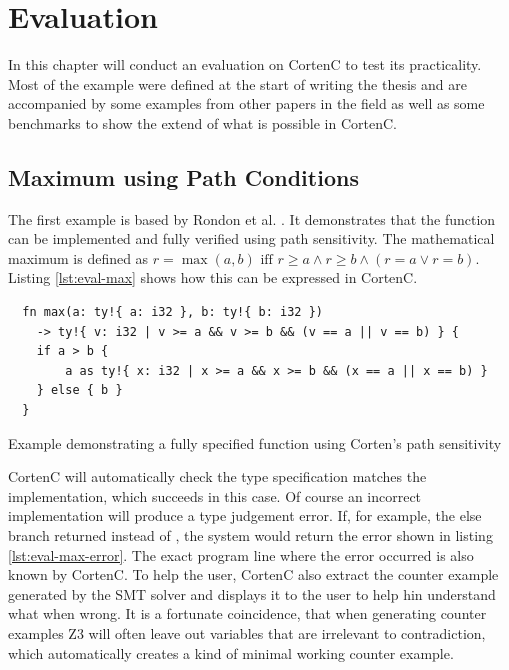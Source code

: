 \documentclass[twoside, english, final]{sdqthesis}
\theoremstyle{definition}
\begin{document}

\chapter{Evaluation} \label{ch:evaluation}

In this chapter will conduct an evaluation on CortenC to test its practicality. 
Most of the example were defined at the start of writing the thesis and are accompanied by some examples from other papers in the field as well as some benchmarks to show the extend of what is possible in CortenC.

\section{Maximum using Path Conditions}\label{sec:eval-max}

The first example is based by Rondon et al. \cite{rondon_liquid_2008}. It demonstrates that the  function can be implemented and fully verified using path sensitivity. The mathematical maximum is defined as $r = \max(a, b) \text{ iff } r \geq a \wedge r \geq b \wedge (r = a \vee r = b)$. Listing \ref{lst:eval-max} shows how this can be expressed in CortenC.


\begin{listing}[h]
  \begin{verbatim}
  fn max(a: ty!{ a: i32 }, b: ty!{ b: i32 }) 
    -> ty!{ v: i32 | v >= a && v >= b && (v == a || v == b) } {
    if a > b {
        a as ty!{ x: i32 | x >= a && x >= b && (x == a || x == b) }
    } else { b }
  }
  \end{verbatim}
  \caption{Example demonstrating a fully specified  function using Corten's path sensitivity}
  \label{lst:eval-max}
\end{listing}

CortenC will automatically check the type specification matches the implementation, which succeeds in this case.
Of course an incorrect implementation will produce a type judgement error. If, for example, the else branch returned  instead of , the system would return the error shown in listing \ref{lst:eval-max-error}. The exact program line where the error occurred is also known by CortenC. To help the user, CortenC also extract the counter example generated by the SMT solver and displays it to the user to help hin understand what when wrong. It is a fortunate coincidence, that when generating counter examples Z3 will often leave out variables that are irrelevant to contradiction, which automatically creates a kind of minimal working counter example.
\end{document}
